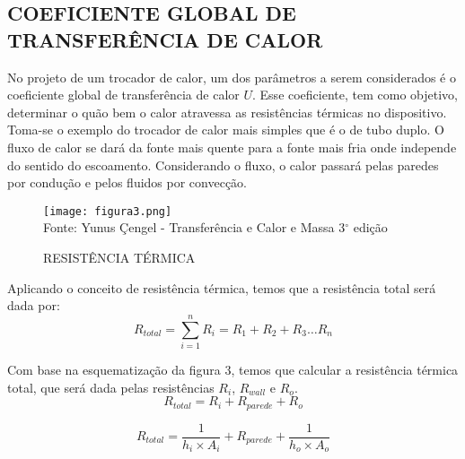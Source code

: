 \documentclass[a4paper,12pt,oneside]{article}
\begin{document}
\begin{flushright}
\pagebreak
\clearpage
\newpage

\subsection{\large COEFICIENTE GLOBAL DE TRANSFERÊNCIA DE CALOR}
\vspace{0.5cm}

No projeto de um trocador de calor, um dos parâmetros a serem considerados é o coeficiente global de transferência de calor $U$. Esse coeficiente, tem como objetivo, determinar o quão bem o calor atravessa as resistências térmicas no dispositivo. Toma-se o exemplo do trocador de calor mais simples que é o de tubo duplo. O fluxo de calor se dará da fonte mais quente para a fonte mais fria onde independe do sentido do escoamento. Considerando o fluxo, o calor passará pelas paredes por condução e pelos fluidos por convecção. \\

\begin{figure}[h]
	\centering
	\caption{RESISTÊNCIA TÉRMICA}
	\vspace{0.5cm}
	\texttt{[image: figura3.png]}
	\vspace{0.5cm}\\
	Fonte: Yunus Çengel - Transferência e Calor e Massa 3$^\circ$ edição
\end{figure}
\vspace{0.5cm}

\pagebreak
\clearpage
\newpage

Aplicando o conceito de resistência térmica, temos que a resistência total será dada por:\\

\begin{equation}\label{eq1}
R_{total} = \sum_{i = 1}^{n}R_{i}  = R_{1} + R_{2} + R_{3}\dots R_{n}
\end{equation}
\vspace{0.5cm}

Com base na esquematização da figura 3, temos que calcular a resistência térmica total, que será dada pelas resistências $R_{i}$, $R_{wall}$ e $R_{o}$.\\

\begin{equation}\label{eq2}
R_{total} = R_{i} + R_{parede} + R_{o}
\end{equation}
\vspace{0.5cm}

\begin{equation}\label{eq3}
R_{total} = \frac{1}{h_{i} \times A_{i}} + R_{parede} + \frac{1}{h_{o} \times A_{o}}
\end{equation}
\vspace{0.5cm}


\end{flushright}
\end{document}
